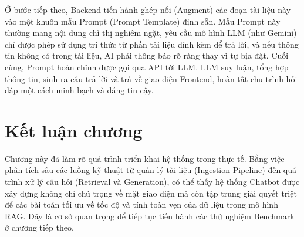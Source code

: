 Ở bước tiếp theo, Backend tiến hành ghép nối (Augment) các đoạn tài liệu này vào một khuôn mẫu Prompt (Prompt Template) định sẵn. Mẫu Prompt này thường mang nội dung chỉ thị nghiêm ngặt, yêu cầu mô hình LLM (như Gemini) chỉ được phép sử dụng tri thức từ phần tài liệu đính kèm để trả lời, và nếu thông tin không có trong tài liệu, AI phải thông báo rõ ràng thay vì tự bịa đặt. Cuối cùng, Prompt hoàn chỉnh được gọi qua API tới LLM. LLM suy luận, tổng hợp thông tin, sinh ra câu trả lời và trả về giao diện Frontend, hoàn tất chu trình hỏi đáp một cách minh bạch và đáng tin cậy.

\section{Kết luận chương}

Chương này đã làm rõ quá trình triển khai hệ thống trong thực tế. Bằng việc phân tích sâu các luồng kỹ thuật từ quản lý tài liệu (Ingestion Pipeline) đến quá trình xử lý câu hỏi (Retrieval và Generation), có thể thấy hệ thống Chatbot được xây dựng không chỉ chú trọng về mặt giao diện mà còn tập trung giải quyết triệt để các bài toán tối ưu về tốc độ và tính toàn vẹn của dữ liệu trong mô hình RAG. Đây là cơ sở quan trọng để tiếp tục tiến hành các thử nghiệm Benchmark ở chương tiếp theo.